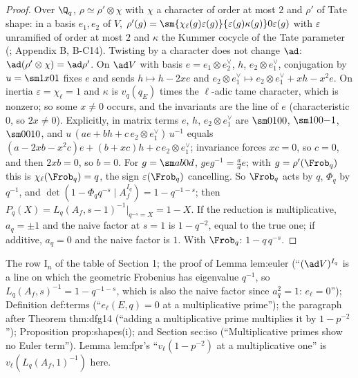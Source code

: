 \begin{proof}
Over $\Q_q$, $\rho\simeq\rho'\otimes\chi$ with $\chi$ a character of order at most $2$ and $\rho'$ of Tate shape: in a basis $e_1,e_2$ of $V$,
$\rho'(g)=\sm{\chi_\ell(g)\varepsilon(g)}{\varepsilon(g)\kappa(g)}0{\varepsilon(g)}$ with $\varepsilon$ unramified of order at most $2$ and $\kappa$ the Kummer cocycle of the Tate parameter
(; Appendix B, B-C14). Twisting by a character does not change $\ad$: $\ad(\rho'\otimes\chi)=\ad\rho'$. On $\ad V$ with basis $e=e_1\otimes e_2^\vee$, $h$, $e_2\otimes e_1^\vee$,
conjugation by $u=\sm1x01$ fixes $e$ and sends $h\mapsto h-2xe$ and $e_2\otimes e_1^\vee\mapsto e_2\otimes e_1^\vee+xh-x^2e$. On inertia $\varepsilon=\chi_\ell=1$ and $\kappa$ is $v_q(q_E)$ times the
$\ell$-adic tame character, which is nonzero; so some $x\ne0$ occurs, and the invariants are the line of $e$ (characteristic $0$, so $2x\ne0$). Explicitly, in matrix terms
$e$, $h$, $e_2\otimes e_1^\vee$ are $\sm0100$, $\sm100{-1}$, $\sm0010$, and $u\,(ae+bh+c\,e_2\otimes e_1^\vee)\,u^{-1}$ equals
$(a-2xb-x^2c)e+(b+xc)h+c\,e_2\otimes e_1^\vee$; invariance forces $xc=0$, so $c=0$, and then $2xb=0$, so $b=0$. For $g=\sm ab0d$,
$geg^{-1}=\frac ade$; with $g=\rho'(\Frob_q)$ this is $\chi_\ell(\Frob_q)=q$, the sign $\varepsilon(\Frob_q)$ cancelling. So $\Frob_q$ acts by $q$, $\Phi_q$ by $q^{-1}$, and
$\det(1-\Phi_qq^{-s}\mid A_f^{I_q})=1-q^{-1-s}$; then $P_q(X)=L_q(A_f,s-1)^{-1}|_{q^{-s}=X}=1-X$. If the reduction is multiplicative, $a_q=\pm1$ and the naive factor at $s=1$ is
$1-q^{-2}$, equal to the true one; if additive, $a_q=0$ and the naive factor is $1$. With $\Frob_q$: $1-q\,q^{-s}$.
\end{proof}

\begin{paperlink}
The row $\mathrm I_n$ of the table of Section 1; the proof of Lemma lem:euler (``$(\ad V)^{I_q}$ is a line on which the geometric Frobenius has eigenvalue $q^{-1}$, so
$L_q(A_f,s)^{-1}=1-q^{-1-s}$, which is also the naive factor since $a_q^2=1$: $e_\ell=0$''); Definition def:terms (``$e_\ell(E,q)=0$ at a multiplicative prime''); the paragraph after Theorem thm:dfg14 (``adding a multiplicative prime multiplies it by $1-p^{-2}$''); Proposition prop:shapes(i); and Section
sec:iso (``Multiplicative primes show no Euler term''). Lemma lem:fpr's ``$v_\ell(1-p^{-2})$ at a multiplicative one'' is $v_\ell(L_q(A_f,1)^{-1})$ here.
\end{paperlink}

